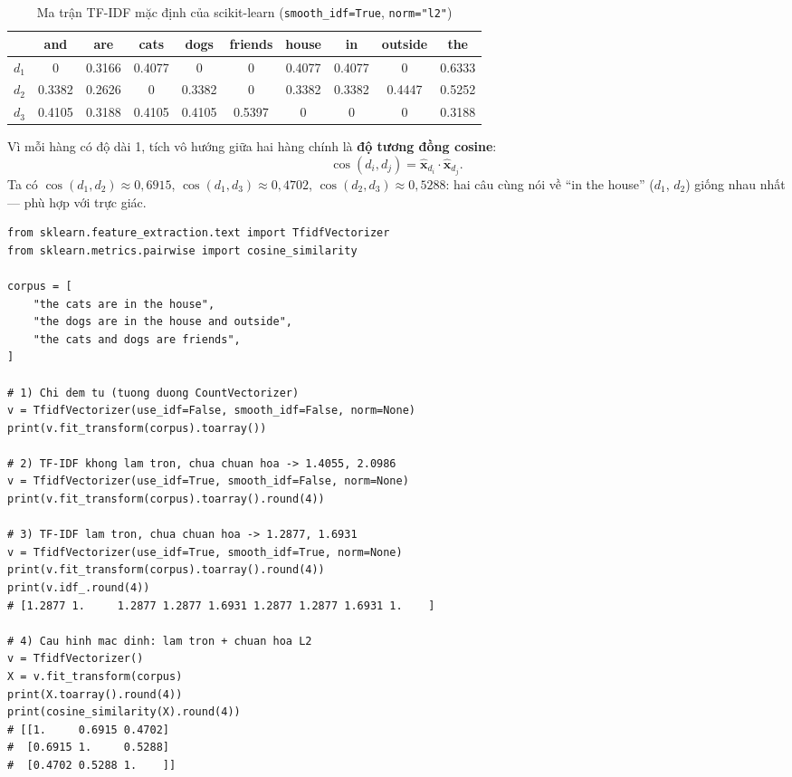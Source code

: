 \begin{table}[H]
\centering
\small
\begin{tabular}{|l|c|c|c|c|c|c|c|c|c|}
\hline
 & and & are & cats & dogs & friends & house & in & outside & the \\
\hline
$d_1$ & 0 & 0.3166 & 0.4077 & 0 & 0 & 0.4077 & 0.4077 & 0 & 0.6333 \\ \hline
$d_2$ & 0.3382 & 0.2626 & 0 & 0.3382 & 0 & 0.3382 & 0.3382 & 0.4447 & 0.5252 \\ \hline
$d_3$ & 0.4105 & 0.3188 & 0.4105 & 0.4105 & 0.5397 & 0 & 0 & 0 & 0.3188 \\ \hline
\end{tabular}
\caption{Ma trận TF-IDF mặc định của scikit-learn (\texttt{smooth\_idf=True}, \texttt{norm="l2"})}
\label{tab:tfidf-l2}
\end{table}

Vì mỗi hàng có độ dài 1, tích vô hướng giữa hai hàng chính là \textbf{độ tương đồng cosine}:
\begin{equation}
    \cos(d_i, d_j) = \hat{\mathbf{x}}_{d_i} \cdot \hat{\mathbf{x}}_{d_j}.
\end{equation}
Ta có $\cos(d_1, d_2) \approx 0{,}6915$, $\cos(d_1, d_3) \approx 0{,}4702$, $\cos(d_2, d_3) \approx 0{,}5288$: hai câu cùng nói về ``in the house'' ($d_1$, $d_2$) giống nhau nhất --- phù hợp với trực giác.

\begin{lstlisting}[caption={TF-IDF Vectorizer với các cấu hình khác nhau}]
from sklearn.feature_extraction.text import TfidfVectorizer
from sklearn.metrics.pairwise import cosine_similarity

corpus = [
    "the cats are in the house",
    "the dogs are in the house and outside",
    "the cats and dogs are friends",
]

# 1) Chi dem tu (tuong duong CountVectorizer)
v = TfidfVectorizer(use_idf=False, smooth_idf=False, norm=None)
print(v.fit_transform(corpus).toarray())

# 2) TF-IDF khong lam tron, chua chuan hoa -> 1.4055, 2.0986
v = TfidfVectorizer(use_idf=True, smooth_idf=False, norm=None)
print(v.fit_transform(corpus).toarray().round(4))

# 3) TF-IDF lam tron, chua chuan hoa -> 1.2877, 1.6931
v = TfidfVectorizer(use_idf=True, smooth_idf=True, norm=None)
print(v.fit_transform(corpus).toarray().round(4))
print(v.idf_.round(4))
# [1.2877 1.     1.2877 1.2877 1.6931 1.2877 1.2877 1.6931 1.    ]

# 4) Cau hinh mac dinh: lam tron + chuan hoa L2
v = TfidfVectorizer()
X = v.fit_transform(corpus)
print(X.toarray().round(4))
print(cosine_similarity(X).round(4))
# [[1.     0.6915 0.4702]
#  [0.6915 1.     0.5288]
#  [0.4702 0.5288 1.    ]]
\end{lstlisting}

